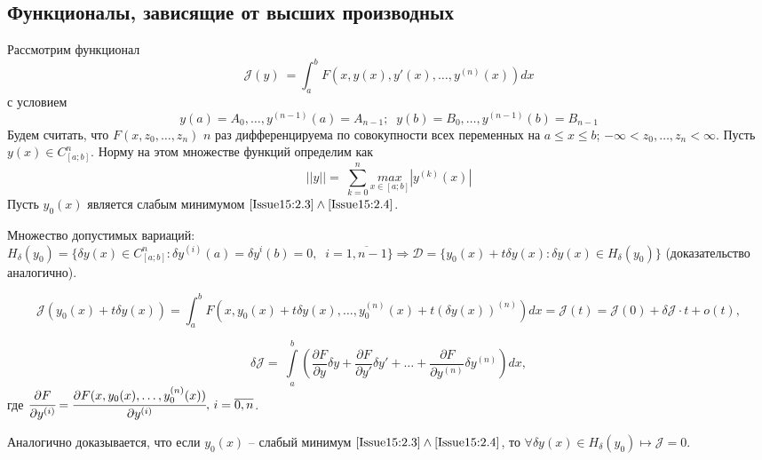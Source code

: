 
\subsection{Функционалы, зависящие от высших производных}
Рассмотрим функционал 
\begin{equation} \label{Issue15:2.3}
    \mathcal{J}(y) ~ = \int_a^bF(x,y(x),y'(x),\dots , y^{(n)}(x))d x
\end{equation}
с условием 
\begin{equation}
    \label{Issue15:2.4}
    y(a)=A_0,\dots ,y^{(n-1)}(a)=A_{n-1};\;\;y(b)=B_0,\dots , y^{(n-1)}(b)=B_{n-1}
\end{equation}
Будем считать, что $F(x,z_0,\dots , z_n)$ $n$ раз дифференцируема по совокупности всех переменных на $a\leqslant x\leqslant b$; $-\infty < z_0, \dots , z_n< \infty $. Пусть $y(x)\in C^n_{[a;b]}$. Норму на этом множестве функций определим как $$||y||= ~ \sum_{k=0}^{n}\underset{x \in [a;b]}{max}|y^{(k)}(x)|$$
Пусть $y_0(x)$ является слабым минимумом $\eqref{Issue15:2.3}\wedge \eqref{Issue15:2.4}$.

Множество допустимых вариаций: $H_\delta(y_0)=\{ \delta y(x) \in C_{[a;b]}^n: \delta y^{(i)}(a)=\delta y^{i}(b)=0,\;\;i=\overline{1,n-1}\}\Rightarrow \mathcal{D}=\{y_0(x)+t\delta y(x):\delta y(x)\in H_\delta (y_0) \}$ (доказательство аналогично).

\[
    \mathcal{J}(y_0(x)+t\delta y(x)) = \int^b_a F(x, y_0(x)+t\delta y(x),\dots ,y_0^{(n)}(x)+t(\delta y(x))^{(n)} )dx =\mathcal{J}(t)=\mathcal{J}(0)+\delta\mathcal{J} \cdot t+o(t), 
\]

\[
    \delta \mathcal{J}= ~ \int\limits_a^b(\frac{\partial F}{\partial y}\delta y + \frac{\partial F}{\partial y'}\delta y' +\dots +  \frac{\partial F}{\partial y^{(n)}}\delta y^{(n)} ) dx,
\]
 где $\cfrac{\partial F}{\partial y^{(i)}}= \cfrac{\partial F(x,y_0(x),\dots,y_0^{(n)}(x))}{\partial y^{(i)}}, \, i = \overline{0, n}$.

Аналогично доказывается, что если $y_0(x)$ -- слабый минимум $\eqref{Issue15:2.3}\wedge\eqref{Issue15:2.4}$, то $\forall\delta y(x)\in H_\delta (y_0) \mapsto \mathcal{J} = 0$.

